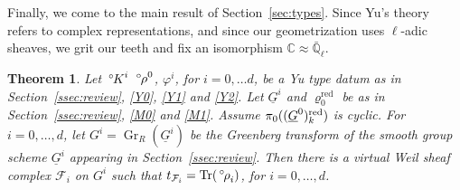 \documentclass[10pt]{amsart}
\theoremstyle{plain}
\newtheorem{theorem}{Theorem}[section]
\theoremstyle{definition}
\newcommand{\CC}{{\mathbb{C}}}
\newcommand{\EE}{\mathbb{\bar Q}_\ell}
\newcommand{\Fq}{k}
\DeclareMathOperator{\Gr}{Gr}
\DeclareMathOperator{\trace}{Tr}
\newcommand{\trFrob}[1]{t_{#1}}
\newcommand{\cs}[1]{{\mathcal{#1}}}
\newcommand{\red}{^{\operatorname{red}}}
\newcommand{\oK}{{\,^\circ \hskip-1pt K}}
\newcommand{\orho}{{\,^\circ \hskip-1pt \rho}}
\begin{document}
Finally, we come to the main result of Section~\ref{sec:types}.
%
Since Yu's theory refers to complex representations, and since our geometrization uses $\ell$-adic sheaves, we grit our teeth and fix an isomorphism $\CC \approx \EE$.

\begin{theorem}\label{thm:geotypes}
Let $\oK^i$ $\orho^0$, $\varphi^i$, for $i=0, \ldots d$, be a Yu type datum as in Section~\ref{ssec:review}, \ref{Y0}, \ref{Y1} and \ref{Y2}.
Let $\underline{G}^i$ and $\varrho_0\red$ be as in Section~\ref{ssec:review}, \ref{M0} and \ref{M1}.
Assume $\pi_0((\underline{G}^0)_\Fq^\reductive)$ is cyclic.
For $i=0, \ldots ,d$, let $G^i = \Gr_{R}(\underline{G}^i)$ be the Greenberg transform of the smooth group scheme $\underline{G}^i$ appearing in Section~\ref{ssec:review}.
Then there is a virtual Weil sheaf complex $\cs{F}_i$ on $G^i$ such that $\trFrob{\cs{F}_i} = \trace(\orho_i)$, for $i=0, \ldots , d$.
\end{theorem}
\end{document}
